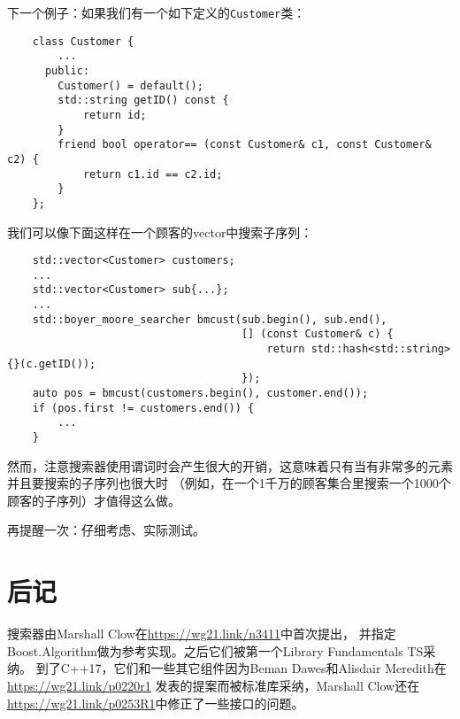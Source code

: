 下一个例子：如果我们有一个如下定义的\texttt{Customer}类：
\begin{lstlisting}
    class Customer {
        ...
      public:
        Customer() = default();
        std::string getID() const {
            return id;
        }
        friend bool operator== (const Customer& c1, const Customer& c2) {
            return c1.id == c2.id;
        }
    };
\end{lstlisting}
我们可以像下面这样在一个顾客的vector中搜索子序列：
\begin{lstlisting}
    std::vector<Customer> customers;
    ...
    std::vector<Customer> sub{...};
    ...
    std::boyer_moore_searcher bmcust(sub.begin(), sub.end(),
                                     [] (const Customer& c) {
                                         return std::hash<std::string>{}(c.getID());
                                     });
    auto pos = bmcust(customers.begin(), customer.end());
    if (pos.first != customers.end()) {
        ...
    }
\end{lstlisting}
然而，注意搜索器使用谓词时会产生很大的开销，这意味着只有当有非常多的元素并且要搜索的子序列也很大时
（例如，在一个1千万的顾客集合里搜索一个1000个顾客的子序列）才值得这么做。

再提醒一次：仔细考虑、实际测试。


\section{后记}
搜索器由Marshall Clow在\url{https://wg21.link/n3411}中首次提出，
并指定Boost.Algorithm做为参考实现。之后它们被第一个Library Fundamentals TS采纳。
到了C++17，它们和一些其它组件因为Beman Dawes和Alisdair Meredith在\url{https://wg21.link/p0220r1}
发表的提案而被标准库采纳，Marshall Clow还在\url{https://wg21.link/p0253R1}中修正了一些接口的问题。